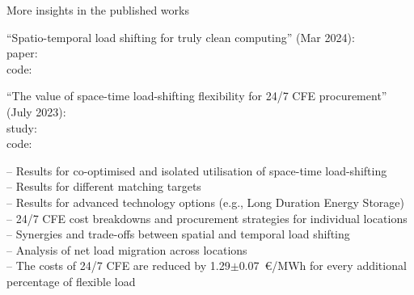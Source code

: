 \begin{frame}{More insights in the published works}

\enquote{Spatio-temporal load shifting for truly clean computing} (Mar 2024): \\
paper:  \\
code: 

\enquote{The value of space-time load-shifting flexibility for 24/7 CFE procurement} (July 2023): \\
study: \\
code: 

      -- Results for \alert{co-optimised} and \alert{isolated} utilisation of space-time load-shifting \\
      -- Results for \alert{different matching targets}\\
      -- Results for advanced \alert{technology options} (e.g., Long Duration Energy Storage)\\
      -- 24/7 CFE \alert{cost breakdowns} and \alert{procurement strategies} for individual locations \\
      -- \alert{Synergies} and \alert{trade-offs} between spatial and temporal load shifting \\
	  -- Analysis of \alert{net load migration} across locations\\
      -- The costs of 24/7 CFE are reduced by \alert{1.29$\pm$0.07~\euro/MWh} for every additional percentage of flexible load

\end{frame}


